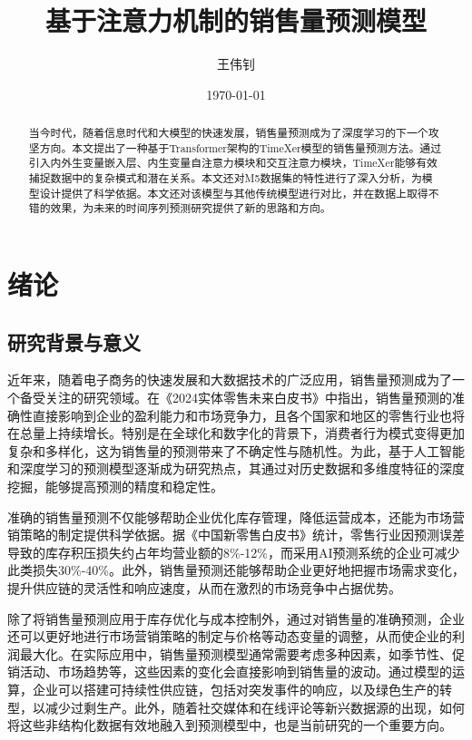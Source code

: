 \documentclass[12pt]{article}
\title{基于注意力机制的销售量预测模型}
\author{王伟钊}
\date{\today}
\begin{document}
\maketitle

\begin{abstract}
    当今时代，随着信息时代和大模型的快速发展，销售量预测成为了深度学习的下一个攻坚方向。本文提出了一种基于Transformer架构的TimeXer模型的销售量预测方法。通过引入内外生变量嵌入层、内生变量自注意力模块和交互注意力模块，TimeXer能够有效捕捉数据中的复杂模式和潜在关系。本文还对M5数据集的特性进行了深入分析，为模型设计提供了科学依据。本文还对该模型与其他传统模型进行对比，并在数据上取得不错的效果，为未来的时间序列预测研究提供了新的思路和方向。
    
\end{abstract}

\newpage

\tableofcontents

\newpage

\section{绪论}

\subsection{研究背景与意义}
近年来，随着电子商务的快速发展和大数据技术的广泛应用，销售量预测成为了一个备受关注的研究领域。在《2024实体零售未来白皮书》中指出，销售量预测的准确性直接影响到企业的盈利能力和市场竞争力\cite{Hanshuo2024}，且各个国家和地区的零售行业也将在总量上持续增长。特别是在全球化和数字化的背景下，消费者行为模式变得更加复杂和多样化，这为销售量的预测带来了不确定性与随机性。为此，基于人工智能和深度学习的预测模型逐渐成为研究热点，其通过对历史数据和多维度特征的深度挖掘，能够提高预测的精度和稳定性。

准确的销售量预测不仅能够帮助企业优化库存管理，降低运营成本，还能为市场营销策略的制定提供科学依据。据《中国新零售白皮书》统计\cite{hurun2023}，零售行业因预测误差导致的库存积压损失约占年均营业额的8\%-12\%，而采用AI预测系统的企业可减少此类损失30\%-40\%。此外，销售量预测还能够帮助企业更好地把握市场需求变化，提升供应链的灵活性和响应速度，从而在激烈的市场竞争中占据优势。

除了将销售量预测应用于库存优化与成本控制外，通过对销售量的准确预测，企业还可以更好地进行市场营销策略的制定与价格等动态变量的调整，从而使企业的利润最大化。在实际应用中，销售量预测模型通常需要考虑多种因素，如季节性、促销活动、市场趋势等，这些因素的变化会直接影响到销售量的波动。通过模型的运算，企业可以搭建可持续性供应链，包括对突发事件的响应，以及绿色生产的转型，以减少过剩生产。此外，随着社交媒体和在线评论等新兴数据源的出现，如何将这些非结构化数据有效地融入到预测模型中，也是当前研究的一个重要方向。
\end{document}
